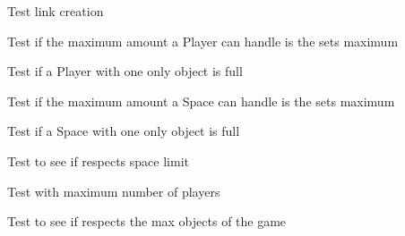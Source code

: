 \begin{DoxyRefList}
\item[\label{test__test000126}%
\hypertarget{test__test000126}{}%
Member \hyperlink{link__test_8h_a159475c79eaec945c64ec6da610a89a0}{test4\+\_\+link\+\_\+create} ()]Test link creation  
\item[\label{test__test000186}%
\hypertarget{test__test000186}{}%
Member \hyperlink{player__test_8h_aa3a3053dd61cc8d45d019aa37e9f1379}{test4\+\_\+player\+\_\+get\+\_\+objects\+\_\+number} ()]Test if the maximum amount a Player can handle is the sets maximum  
\item[\label{test__test000200}%
\hypertarget{test__test000200}{}%
Member \hyperlink{player__test_8h_a96dcde9701d8318c454b634c13969503}{test4\+\_\+player\+\_\+is\+\_\+full} ()]Test if a Player with one only object is full  
\item[\label{test__test000244}%
\hypertarget{test__test000244}{}%
Member \hyperlink{space__test_8h_a8ce42751118666292a020b422fdf47d7}{test4\+\_\+space\+\_\+get\+\_\+objects\+\_\+number} ()]Test if the maximum amount a Space can handle is the sets maximum  
\item[\label{test__test000253}%
\hypertarget{test__test000253}{}%
Member \hyperlink{space__test_8h_a72720dff6c59a68817065ab4782c415a}{test4\+\_\+space\+\_\+is\+\_\+full} ()]Test if a Space with one only object is full  
\item[\label{test__test000051}%
\hypertarget{test__test000051}{}%
Member \hyperlink{game__test_8h_adeda95b2589eb0d71bf75fb8d567b51a}{test5\+\_\+game\+\_\+add\+\_\+object} ()]Test to see if respects space limit  
\item[\label{test__test000046}%
\hypertarget{test__test000046}{}%
Member \hyperlink{game__test_8h_a2a13a20e66d04d3d99812ad9b331a912}{test5\+\_\+game\+\_\+add\+\_\+player} ()]Test with maximum number of players  
\item[\label{test__test000052}%
\hypertarget{test__test000052}{}%
Member \hyperlink{game__test_8h_a6e0bfd68c1415964c3cd0e03bbcc1acb}{test6\+\_\+game\+\_\+add\+\_\+object} ()]Test to see if respects the max objects of the game 
\end{DoxyRefList}